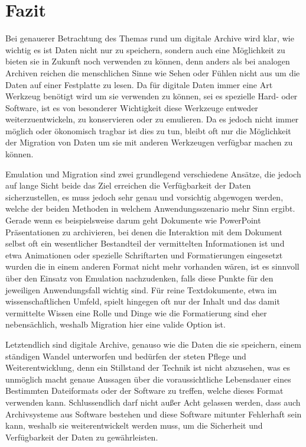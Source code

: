 \documentclass[conference,compsoc,final,a4paper]{IEEEtran}
\begin{document}
\section{Fazit}
Bei genauerer Betrachtung des Themas rund um digitale Archive wird klar, wie wichtig es ist Daten nicht nur zu speichern, sondern auch eine Möglichkeit zu bieten sie in Zukunft noch verwenden zu können, denn anders als bei analogen Archiven reichen die menschlichen Sinne wie Sehen oder Fühlen nicht aus um die Daten auf einer Festplatte zu lesen. Da für digitale Daten immer eine Art Werkzeug benötigt wird um sie verwenden zu können, sei es spezielle Hard- oder Software, ist es von besonderer Wichtigkeit diese Werkzeuge entweder weiterzuentwickeln, zu konservieren oder zu emulieren. Da es jedoch nicht immer möglich oder ökonomisch tragbar ist dies zu tun, bleibt oft nur die Möglichkeit der Migration von Daten um sie mit anderen Werkzeugen verfügbar machen zu können.

Emulation und Migration sind zwei grundlegend verschiedene Ansätze, die jedoch auf lange Sicht beide das Ziel erreichen die Verfügbarkeit der Daten sicherzustellen, es muss jedoch sehr genau und vorsichtig abgewogen werden, welche der beiden Methoden in welchem Anwendungsszenario mehr Sinn ergibt. Gerade wenn es beispielsweise darum geht Dokumente wie PowerPoint Präsentationen zu archivieren, bei denen die Interaktion mit dem Dokument selbst oft ein wesentlicher Bestandteil der vermittelten Informationen ist und etwa Animationen oder spezielle Schriftarten und Formatierungen eingesetzt wurden die in einem anderen Format nicht mehr vorhanden wären, ist es sinnvoll über den Einsatz von Emulation nachzudenken, falls diese Punkte für den jeweiligen Anwendungsfall wichtig sind. Für reine Textdokumente, etwa im wissenschaftlichen Umfeld, spielt hingegen oft nur der Inhalt und das damit vermittelte Wissen eine Rolle und Dinge wie die Formatierung sind eher nebensächlich, weshalb Migration hier eine valide Option ist.

Letztendlich sind digitale Archive, genauso wie die Daten die sie speichern, einem ständigen Wandel unterworfen und bedürfen der steten Pflege und Weiterentwicklung, denn ein Stillstand der Technik ist nicht abzusehen, was es unmöglich macht genaue Aussagen über die voraussichtliche Lebensdauer eines Bestimmten Dateiformats oder der Software zu treffen, welche dieses Format verwenden kann. Schlussendlich darf nicht außer Acht gelassen werden, dass auch Archivsysteme aus Software bestehen und diese Software mitunter Fehlerhaft sein kann, weshalb sie weiterentwickelt werden muss, um die Sicherheit und Verfügbarkeit der Daten zu gewährleisten.
\end{document}

